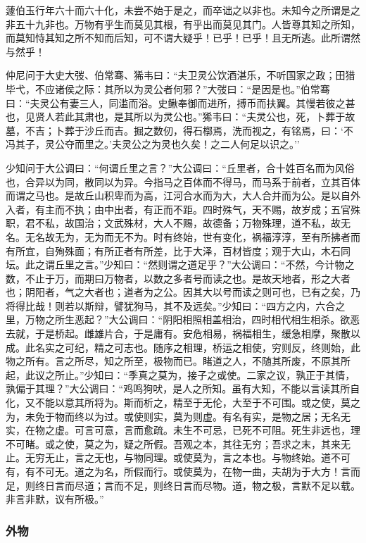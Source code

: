 \documentclass[]{article}
\begin{document}
蘧伯玉行年六十而六十化，未尝不始于是之，而卒诎之以非也。未知今之所谓是之非五十九非也。万物有乎生而莫见其根，有乎出而莫见其门。人皆尊其知之所知，而莫知恃其知之所不知而后知，可不谓大疑乎！已乎！已乎！且无所逃。此所谓然与然乎！

仲尼问于大史大弢、伯常骞、狶韦曰：``夫卫灵公饮酒湛乐，不听国家之政；田猎毕弋，不应诸侯之际：其所以为灵公者何邪？''大弢曰：``是因是也。''伯常骞曰：``夫灵公有妻三人，同滥而浴。史鳅奉御而进所，搏币而扶翼。其慢若彼之甚也，见贤人若此其肃也，是其所以为灵公也。''狶韦曰：``夫灵公也，死，卜葬于故墓，不吉；卜葬于沙丘而吉。掘之数仞，得石槨焉，洗而视之，有铭焉，曰：`不冯其子，灵公夺而里之。'夫灵公之为灵也久矣！之二人何足以识之。''

少知问于大公调曰：``何谓丘里之言？''大公调曰：``丘里者，合十姓百名而为风俗也，合异以为同，散同以为异。今指马之百体而不得马，而马系于前者，立其百体而谓之马也。是故丘山积卑而为高，江河合水而为大，大人合并而为公。是以自外入者，有主而不执；由中出者，有正而不距。四时殊气，天不赐，故岁成；五官殊职，君不私，故国治；文武殊材，大人不赐，故德备；万物殊理，道不私，故无名。无名故无为，无为而无不为。时有终始，世有变化，祸福淳淳，至有所拂者而有所宜，自殉殊面；有所正者有所差，比于大泽，百材皆度；观于大山，木石同坛。此之谓丘里之言。''少知曰：``然则谓之道足乎？''大公调曰：``不然，今计物之数，不止于万，而期曰万物者，以数之多者号而读之也。是故天地者，形之大者也；阴阳者，气之大者也；道者为之公。因其大以号而读之则可也，已有之矣，乃将得比哉！则若以斯辩，譬犹狗马，其不及远矣。''少知曰：``四方之内，六合之里，万物之所生恶起？''大公调曰：``阴阳相照相盖相治，四时相代相生相杀。欲恶去就，于是桥起。雌雄片合，于是庸有。安危相易，祸福相生，缓急相摩，聚散以成。此名实之可纪，精之可志也。随序之相理，桥运之相使，穷则反，终则始，此物之所有。言之所尽，知之所至，极物而已。睹道之人，不随其所废，不原其所起，此议之所止。''少知曰：``季真之莫为，接子之或使。二家之议，孰正于其情，孰偏于其理？''大公调曰：``鸡鸣狗吠，是人之所知。虽有大知，不能以言读其所自化，又不能以意其所将为。斯而析之，精至于无伦，大至于不可围。或之使，莫之为，未免于物而终以为过。或使则实，莫为则虚。有名有实，是物之居；无名无实，在物之虚。可言可意，言而愈疏。未生不可忌，已死不可阻。死生非远也，理不可睹。或之使，莫之为，疑之所假。吾观之本，其往无穷；吾求之末，其来无止。无穷无止，言之无也，与物同理。或使莫为，言之本也。与物终始。道不可有，有不可无。道之为名，所假而行。或使莫为，在物一曲，夫胡为于大方！言而足，则终日言而尽道；言而不足，则终日言而尽物。道，物之极，言默不足以载。非言非默，议有所极。''

\hypertarget{header-n428}{%
\subsubsection{外物}\label{header-n428}}
\end{document}
